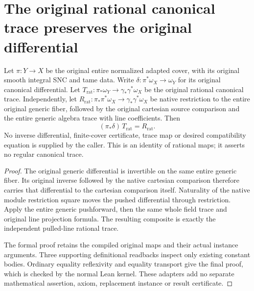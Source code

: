 \section{The original rational canonical trace preserves the original differential}

\begin{theorem}
\label{thm:kn-canonical-original-rational-differential-compatibility}
\leanok
Let $\pi:Y\to X$ be the original entire normalized adapted cover, with
its original smooth integral SNC and tame data. Write
$\delta:\pi^*\omega_X\to\omega_Y$ for its original canonical differential.
Let $T_{\mathrm{rat}}:\pi_*\omega_Y\to\gamma_*\gamma^*\omega_X$ be the
original rational canonical trace. Independently, let
$R_{\mathrm{rat}}:\pi_*\pi^*\omega_X\to\gamma_*\gamma^*\omega_X$ be
native restriction to the entire original generic fiber, followed by the
original cartesian source comparison and the entire generic algebra
trace with line coefficients. Then
\[
  (\pi_*\delta)\,T_{\mathrm{rat}}=R_{\mathrm{rat}}.
\]
No inverse differential, finite-cover certificate, trace map or desired
compatibility equation is supplied by the caller. This is an identity
of rational maps; it asserts no regular canonical trace.
\end{theorem}
\begin{proof}
The original generic differential is invertible on the same entire
generic fiber. Its original inverse followed by the native cartesian
comparison therefore carries that differential to the cartesian
comparison itself. Naturality of the native module restriction square
moves the pushed differential through restriction. Apply the entire
generic pushforward, then the same whole field trace and original line
projection formula. The resulting composite is exactly the independent
pulled-line rational trace.

The formal proof retains the compiled original maps and their actual
instance arguments. Three supporting definitional readbacks inspect
only existing constant bodies. Ordinary equality reflexivity and
equality transport give the final proof, which is checked by the normal
Lean kernel. These adapters add no separate mathematical assertion,
axiom, replacement instance or result certificate.
\end{proof}
